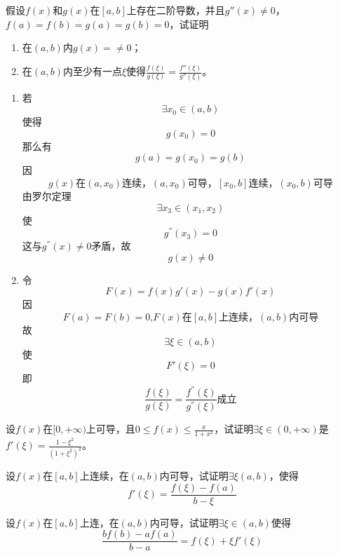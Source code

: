 \begin{example}
	假设$f(x)$和$g(x)$在$[a,b]$上存在二阶导数，并且$g''(x)\neq 0$，$f(a)=f(b)=g(a)=g(b)=0$，试证明
	\begin{enumerate}
		\item 在$(a,b)$内$g(x)=\neq 0$；
		\item 在$(a,b)$内至少有一点$\xi$使得$\frac{f(\xi)}{g(\xi)}=\frac{f''(\xi)}{g''(\xi)}$。
	\end{enumerate}
\end{example}
	\begin{newproof}
		\begin{enumerate}
			\item 若\[\exists x_0\in \left( a,b \right) \]
			使得\[g\left( x_0 \right) =0\]
			那么有\[g\left( a \right) =g\left( x_0 \right) =g\left( b \right) \]
			因\[g\left( x \right) \text{在}\left( a,x_0 \right) \text{连续，}\left( a,x_0 \right) \text{可导，}\left[ x_0,b \right] \text{连续，}\left( x_0,b \right) \text{可导}\]
			由罗尔定理\[\exists x_3\in \left( x_1,x_2 \right) \]
			使\[g^{''}\left( x_3 \right) =0\]
			这与$g^{''}\left( x \right) \ne 0$矛盾，故\[g\left( x \right) \ne 0\]

			\item 令\[F\left( x \right) =f\left( x \right) g'\left( x \right) -g\left( x \right) f'\left( x \right) \]
			因\[F\left( a \right) =F\left( b \right) =\text{0,}F\left( x \right) \text{在}\left[ a,b \right] \text{上连续，}\left( a,b \right) \text{内可导}\]
			故\[\exists \xi \in \left( a,b \right) \]
			使\[F'\left( \xi \right) =0\]
			即\[\frac{f\left( \xi \right)}{g\left( \xi \right)}=\frac{f^{''}\left( \xi \right)}{g^{''}\left( \xi \right)}\text{成立}\]
			
		\end{enumerate}
		
	\end{newproof}
\begin{example}
	设$f(x)$在$[0,+\infty)$上可导，且$0\leqslant f(x)\leqslant\frac{x}{1+x^2}$，试证明$\exists\xi\in(0,+\infty)$是$f'(\xi)=\frac{1-\xi^2}{(1+\xi^2)^2}$。
\end{example}

\begin{example}
	设$f(x)$在$[a,b]$上连续，在$(a,b)$内可导，试证明$\exists\xi(a,b)$，使得\[f'(\xi)=\frac{f(\xi)-f(a)}{b-\xi}\]
\end{example}

\begin{example}
	设$f(x)$在$[a,b]$上连，在$(a,b)$内可导，试证明$\exists\xi\in(a,b)$使得\[\frac{bf(b)-af(a)}{b-a}=f(\xi)+\xi f'(\xi)\]
\end{example}

